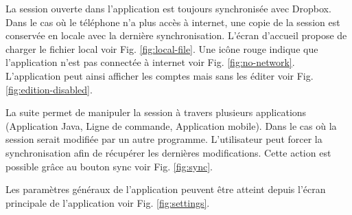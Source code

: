 \begin{center}
	\begin{minipage}{.3\textwidth}
	\end{minipage}
	\begin{minipage}{.3\textwidth}
	\end{minipage}
\end{center}

La session ouverte dans l'application est toujours synchronisée avec Dropbox. Dans le cas où le téléphone n'a plus accès à internet, une copie de la session est conservée en locale avec la dernière synchronisation. L'écran d'accueil propose de charger le fichier local voir Fig. \ref{fig:local-file}. Une icône rouge indique que l'application n'est pas connectée à internet voir Fig. \ref{fig:no-network}. L'application peut ainsi afficher les comptes mais sans les éditer voir Fig. \ref{fig:edition-disabled}.

\begin{center}
	\begin{minipage}{.3\textwidth}
	\end{minipage}
	\begin{minipage}{.3\textwidth}
	\end{minipage}
	\begin{minipage}{.3\textwidth}
	\end{minipage}        
\end{center}

La suite \easypass{} permet de manipuler la session à travers plusieurs applications (Application Java, Ligne de commande, Application mobile). Dans le cas où la session serait modifiée par un autre programme. L'utilisateur peut forcer la synchronisation afin de récupérer les dernières modifications. Cette action est possible grâce au bouton sync voir Fig. \ref{fig:sync}.


Les paramètres généraux de l'application peuvent être atteint depuis l'écran principale de l'application  voir Fig. \ref{fig:settings}. 

